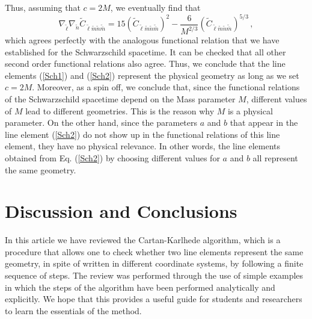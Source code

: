 \documentclass[twocolumn,prd,aps,showpacs,showkeys,amsmath,amssymb]{revtex4-1}
\begin{document}
Thus, assuming that $c=2M$, we eventually find that
$$
\nabla_{\tilde{\ell}} \nabla_{\tilde{n}}\tilde{C}_{\tilde{\ell} \tilde{m}  \tilde{n} \tilde{\bar{m}}} =
15 (\tilde{C}_{\tilde{\ell} \tilde{m}  \tilde{n} \tilde{\bar{m}}} )^2 - \frac{6}{M^{2/3}}(\tilde{C}_{\tilde{\ell} \tilde{m}  \tilde{n} \tilde{\bar{m}}} )^{5/3} \,,
$$
which agrees perfectly with the analogous functional relation that we have established for the Schwarzschild spacetime. It can be checked that all other second order functional relations also agree. Thus, we conclude that the line elements (\ref{Sch1}) and (\ref{Sch2}) represent the physical geometry as long as we set $c=2M$. Moreover, as a spin off, we conclude that, since the functional relations of the Schwarzschild spacetime depend on the Mass parameter $M$, different values  of $M$ lead to different geometries. This is the reason why $M$ is a physical parameter. On the other hand, since the parameters $a$ and $b$ that appear in the line element (\ref{Sch2}) do not show up in the functional relations of this line element, they have no physical relevance. In other words, the line elements obtained from Eq. (\ref{Sch2}) by choosing different values for $a$ and $b$ all represent the same geometry.









\section{Discussion and Conclusions} \label{Sec.Conclusion}


In this article we have reviewed the  Cartan-Karlhede algorithm, which is a procedure that allows one to check whether two line elements represent the same geometry, in spite of written in different coordinate systems, by following a finite sequence of steps. The review was performed through the use of simple examples in which the steps of the algorithm have been performed analytically and explicitly. We hope that this provides a useful guide for students and researchers to learn the essentials of the method.
\end{document}
